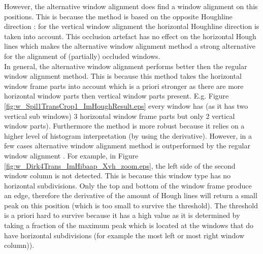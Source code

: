 However, the alternative window alignment does find a window alignment on this
positions. This is because the method is based on the opposite Houghline
direction : for the vertical window alignment the horizontal Houghline direction
is taken into account.  This occlusion artefact has no effect on the horizontal
Hough lines which makes the alternative window alignment method a strong
alternative for the alignment of (partially) occluded windows.\\

In general, the alternative window alignment performs better then the regular
window alignment method.  This is because this method takes the  horizontal
window frame parts into account which is a priori stronger as there are more
horizontal window parts then vertical window parts present.  E.g. Figure
\ref{fig:w_Spil1TransCrop1_ImHoughResult.eps} every window has (as it has two
vertical sub windows) 3 horizontal window frame parts but only 2 vertical window
parts).  Furthermore the method is more robust because it relies on a higher
level of histogram interpretation (by using the derivative).  However, in a few
cases alternative window alignment method is outperformed by the regular window
alignment . For example, in Figure
\ref{fig:w_Dirk4Trans_ImHibaap_Xvh_zoom.eps}, the left
side of the second window column is not detected.
This is because this window type has no horizontal subdivisions. Only the top and
bottom of the window frame produce an edge, therefore the derivative of the
amount of Hough lines will return a small peak on this position (which is too
small to survive the threshold).  
The threshold is a priori hard to survive because it has a high value as it is
determined by taking a fraction of the maximum peak which is located at the
windows that do have horizontal subdivisions (for example the most left or most
right window column)). 





